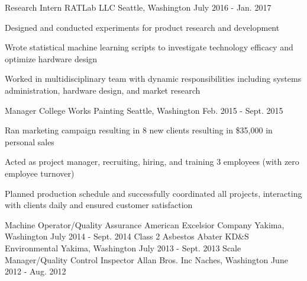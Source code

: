 

\begin{cventries}

  \cventry
    {Research Intern} %
    {RATLab LLC} %
    {Seattle, Washington} %
    {July 2016 - Jan. 2017} %
    {
      \begin{cvitems} %
        \item {Designed and conducted experiments for product research and development}
        \item {Wrote statistical machine learning scripts to investigate technology efficacy and optimize hardware design}
        \item {Worked in multidisciplinary team with dynamic responsibilities including systems administration, hardware design, and market research}
      \end{cvitems}
    }

  \cventry
    {Manager} %
    {College Works Painting} %
    {Seattle, Washington} %
    {Feb. 2015 - Sept. 2015} %
    {
      \begin{cvitems} %
        \item {Ran marketing campaign resulting in 8 new clients resulting in \$35,000 in personal sales}
        \item {Acted as project manager, recruiting, hiring, and training 3 employees (with zero employee turnover)}
        \item {Planned production schedule and successfully coordinated all projects, interacting with clients daily and ensured customer satisfaction}
      \end{cvitems}
    }

  \cventry
    {Machine Operator/Quality Assurance} %
    {American Excelsior Company} %
    {Yakima, Washington} %
    {July 2014 - Sept. 2014} %
    {}
\vspace*{-0.3cm}    
  \cventry
    {Class 2 Asbestos Abater} %
    {KD\&S Environmental} %
    {Yakima, Washington} %
    {July 2013 - Sept. 2013} %
    {}
\vspace*{-0.3cm}    
  \cventry
    {Scale Manager/Quality Control Inspector} %
    {Allan Bros. Inc} %
    {Naches, Washington} %
    {June 2012 - Aug. 2012} %
    {}
\vspace*{-0.3cm}
\end{cventries}

